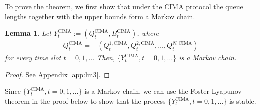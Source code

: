 \documentclass[onecolumn,draftcls]{IEEEtran}
\newtheorem{lemma}{Lemma}
\newcommand{\g}{\text{CIMA}}
\begin{document}
To prove the theorem, we first show that under the $\g$ protocol the queue lengths together with the upper bounds form a Markov chain.
\begin{lemma}
\label{lm:MC}
Let $Y^{\g}_t 
:= (Q^{\g}_t, B^{\g}_t)$, where
\begin{align*}
Q^{\g}_t = &(Q^{1,\g}_t,Q^{2,\g}_t,\dots,Q^{N,\g}_t)
\end{align*}
for every time slot $t=0,1,\dots$
Then, $\{Y^{\g}_t, t=0,1,\dots\}$ is a Markov chain.
\end{lemma}
\begin{proof}
See Appendix \ref{app:lm3}.
\end{proof}


Since $\{Y^{\g}_t, t=0,1,\dots\}$ is a Markov chain, we can use the Foster-Lyapunov theorem in the proof below to show that the process $\{Y^{\g}_t, t=0,1,\dots\}$ is stable.
\end{document}
